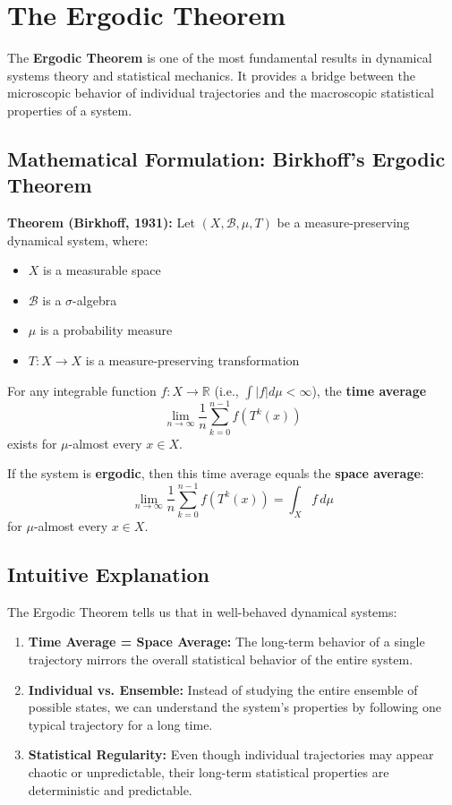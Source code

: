 \documentclass[12pt,a4paper]{article}
\begin{document}
\section{The Ergodic Theorem}

The \textbf{Ergodic Theorem} is one of the most fundamental results in dynamical systems theory and statistical mechanics. It provides a bridge between the microscopic behavior of individual trajectories and the macroscopic statistical properties of a system.

\subsection{Mathematical Formulation: Birkhoff's Ergodic Theorem}

\textbf{Theorem (Birkhoff, 1931):} Let $(X, \mathcal{B}, \mu, T)$ be a measure-preserving dynamical system, where:
\begin{itemize}
    \item $X$ is a measurable space
    \item $\mathcal{B}$ is a $\sigma$-algebra
    \item $\mu$ is a probability measure
    \item $T: X \to X$ is a measure-preserving transformation
\end{itemize}

For any integrable function $f: X \to \mathbb{R}$ (i.e., $\int |f| d\mu < \infty$), the \textbf{time average}
\[
\lim_{n \to \infty} \frac{1}{n} \sum_{k=0}^{n-1} f(T^k(x))
\]
exists for $\mu$-almost every $x \in X$.

If the system is \textbf{ergodic}, then this time average equals the \textbf{space average}:
\[
\lim_{n \to \infty} \frac{1}{n} \sum_{k=0}^{n-1} f(T^k(x)) = \int_X f \, d\mu
\]
for $\mu$-almost every $x \in X$.

\subsection{Intuitive Explanation}

The Ergodic Theorem tells us that in well-behaved dynamical systems:

\begin{enumerate}
    \item \textbf{Time Average = Space Average:} The long-term behavior of a single trajectory mirrors the overall statistical behavior of the entire system.
    \item \textbf{Individual vs. Ensemble:} Instead of studying the entire ensemble of possible states, we can understand the system's properties by following one typical trajectory for a long time.
    \item \textbf{Statistical Regularity:} Even though individual trajectories may appear chaotic or unpredictable, their long-term statistical properties are deterministic and predictable.
\end{enumerate}
\end{document}
